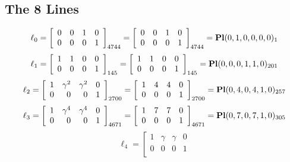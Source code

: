 \documentclass{article}
\begin{document}
{\subsection*{The 8 Lines}
$$
\ell_{0} = 
\left[
\begin{array}{*{4}{r}}
0 & 0 & 1 & 0\\
0 & 0 & 0 & 1\\
\end{array}
\right]
_{4744}
=
\left[
\begin{array}{*{4}c}
0  & 0  & 1  & 0\\
0  & 0  & 0  & 1\\
\end{array}
\right]_{4744}
={\rm\bf Pl}(0,1,0,0,0,0 )_{1}$$
$$
\ell_{1} = 
\left[
\begin{array}{*{4}{r}}
1 & 1 & 0 & 0\\
0 & 0 & 0 & 1\\
\end{array}
\right]
_{145}
=
\left[
\begin{array}{*{4}c}
1  & 1  & 0  & 0\\
0  & 0  & 0  & 1\\
\end{array}
\right]_{145}
={\rm\bf Pl}(0,0,0,1,1,0 )_{201}$$
$$
\ell_{2} = 
\left[
\begin{array}{*{4}{r}}
1 & \gamma^{2} & \gamma^{2} & 0\\
0 & 0 & 0 & 1\\
\end{array}
\right]
_{2700}
=
\left[
\begin{array}{*{4}c}
1  & 4  & 4  & 0\\
0  & 0  & 0  & 1\\
\end{array}
\right]_{2700}
={\rm\bf Pl}(0,4,0,4,1,0 )_{257}$$
$$
\ell_{3} = 
\left[
\begin{array}{*{4}{r}}
1 & \gamma^{4} & \gamma^{4} & 0\\
0 & 0 & 0 & 1\\
\end{array}
\right]
_{4671}
=
\left[
\begin{array}{*{4}c}
1  & 7  & 7  & 0\\
0  & 0  & 0  & 1\\
\end{array}
\right]_{4671}
={\rm\bf Pl}(0,7,0,7,1,0 )_{305}$$
$$
\ell_{4} = 
\left[
\begin{array}{*{4}{r}}
1 & \gamma  & \gamma  & 0\\
0 & 0 & 0 & 1\\

\end{array}$$}
\end{document}
